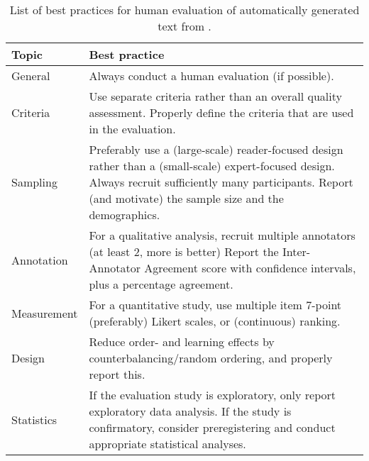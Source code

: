 \documentclass[11pt,a4paper]{article}
\begin{document}
\begin{table}
\begin{center}
\begin{tabular}{  m{4em}  m{5cm} }
 \textbf{Topic} & \textbf{Best practice}  \\ \hline
 General & Always conduct a human evaluation (if possible).  \\  \hline
 Criteria & Use separate criteria rather than an overall quality assessment.
Properly define the criteria that are used in the evaluation. \\\hline
Sampling & Preferably use a (large-scale) reader-focused design rather than a (small-scale) expert-focused design.
Always recruit sufficiently many participants. Report (and motivate) the sample size and the demographics. \\\hline
Annotation &  For a qualitative analysis, recruit multiple annotators (at least 2, more is better)
Report the Inter-Annotator Agreement score with confidence intervals, plus a percentage agreement. \\\hline
Measurement & For a quantitative study, use multiple item 7-point (preferably) Likert scales, or (continuous) ranking. \\\hline
Design &  Reduce order- and learning effects by counterbalancing/random ordering, and properly report this. \\\hline
Statistics & If the evaluation study is exploratory, only report exploratory data analysis.
If the study is confirmatory, consider preregistering and conduct appropriate statistical analyses.
\end{tabular}
\caption{List of best practices for human evaluation of automatically generated text from \citet{van-der-lee-etal-2019-best}.}
\label{table:1}
\end{center}
\end{table}\\\\
\end{document}

